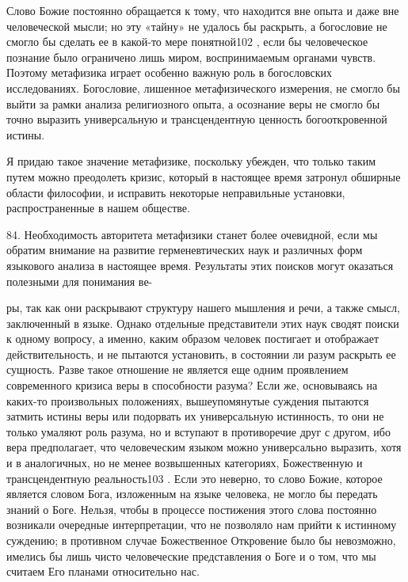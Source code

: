 \documentclass[a5paper,10pt]{article}
\begin{document}
Слово Божие постоянно обращается к тому, что находится вне опыта и даже вне
человеческой мысли; но эту «тайну» не удалось бы раскрыть, а богословие не
смогло бы сделать ее в какой-то мере понятной102 , если бы человеческое
познание было ограничено лишь миром, воспринимаемым органами чувств. Поэтому
метафизика играет особенно важную роль в богословских исследованиях.
Богословие, лишенное метафизического измерения, не смогло бы выйти за рамки
анализа религиозного опыта, а осознание веры не смогло бы точно выразить
универсальную и трансцендентную ценность богооткровенной истины.

Я придаю такое значение метафизике, поскольку убежден, что только таким путем
можно преодолеть кризис, который в настоящее время затронул обширные области
философии, и исправить некоторые неправильные установки, распространенные в
нашем обществе.

84. Необходимость авторитета метафизики станет более очевидной, если мы обратим
внимание на развитие герменевтических наук и различных форм языкового анализа в
настоящее время. Результаты этих поисков могут оказаться полезными для
понимания ве-

ры, так как они раскрывают структуру нашего мышления и речи, а также смысл,
заключенный в языке. Однако отдельные представители этих наук сводят поиски к
одному вопросу, а именно, каким образом человек постигает и отображает
действительность, и не пытаются установить, в состоянии ли разум раскрыть ее
сущность. Разве такое отношение не является еще одним проявлением современного
кризиса веры в способности разума? Если же, основываясь на каких-то
произвольных положениях, вышеупомянутые суждения пытаются затмить истины веры
или подорвать их универсальную истинность, то они не только умаляют роль
разума, но и вступают в противоречие друг с другом, ибо вера предполагает, что
человеческим языком можно универсально выразить, хотя и в аналогичных, но не
менее возвышенных категориях, Божественную и трансцендентную реальность103 .
Если это неверно, то слово Божие, которое является словом Бога, изложенным на
языке человека, не могло бы передать знаний о Боге. Нельзя, чтобы в процессе
постижения этого слова постоянно возникали очередные интерпретации, что не
позволяло нам прийти к истинному суждению; в противном случае Божественное
Откровение было бы невозможно, имелись бы лишь чисто человеческие представления
о Боге и о том, что мы считаем Его планами относительно нас.
\end{document}

